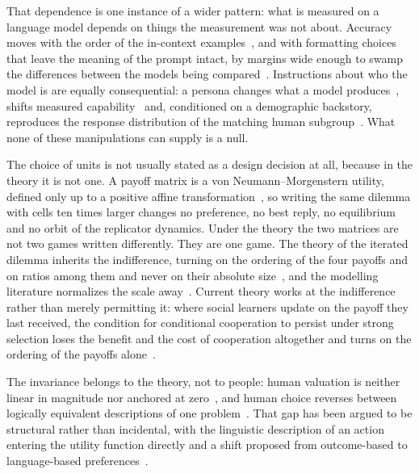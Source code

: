 \documentclass[11pt,a4paper]{article}
\begin{document}
That dependence is one instance of a wider pattern: what is measured on a
language model depends on things the measurement was not about. Accuracy moves
with the order of the in-context examples~\citep{lu2022fantastically}, and with
formatting choices that leave the meaning of the prompt intact, by margins wide
enough to swamp the differences between the models being
compared~\citep{sclar2024quantifying}. Instructions about who the model is are
equally consequential: a persona changes what a model
produces~\citep{deshpande2023toxicity}, shifts measured
capability~\citep{salewski2023context} and, conditioned on a demographic
backstory, reproduces the response distribution of the matching human
subgroup~\citep{argyle2023out}. What none of these manipulations can supply is a
null.

The choice of units is not usually stated as a design decision at all, because
in the theory it is not one. A payoff matrix is a von Neumann--Morgenstern
utility, defined only up to a positive affine
transformation~\citep{vonneumann1944theory,luce1957games}, so writing the same
dilemma with cells ten times larger changes no preference, no best reply, no
equilibrium and no orbit of the replicator dynamics. Under the theory the two
matrices are not two games written differently. They are one game. The theory of
the iterated dilemma inherits the indifference, turning on the ordering of the
four payoffs and on ratios among them and never on their absolute
size~\citep{axelrod1981evolution,nowak1992tit,nowak1993strategy,press2012iterated},
and the modelling literature normalizes the scale
away~\citep{szabo2007evolutionary,perc2010coevolutionary}. Current theory works
at the indifference rather than merely permitting it: where social learners
update on the payoff they last received, the condition for conditional
cooperation to persist under strong selection loses the benefit and the cost of
cooperation altogether and turns on the ordering of the payoffs
alone~\citep{glynatsi2024evolution}.

The invariance belongs to the theory, not to people: human valuation is neither
linear in magnitude nor anchored at zero~\citep{kahneman1979prospect}, and human
choice reverses between logically equivalent descriptions of one
problem~\citep{tversky1981framing}. That gap has been argued to be structural
rather than incidental, with the linguistic description of an action entering
the utility function directly and a shift proposed from outcome-based to
language-based preferences~\citep{capraro2024language}.
\end{document}

